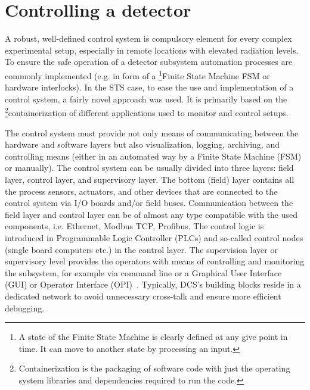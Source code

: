 \section{Controlling a detector}
A robust, well-defined control system is compulsory element for every complex experimental setup, especially in remote locations with elevated radiation levels. To ensure the safe operation of a detector subsystem automation processes are commonly implemented (e.g. in form of a \footnote{A state of the Finite State Machine is clearly defined at any give point in time. It can move to another state by processing an input.}{Finite State Machine} \gls{FSM} or hardware interlocks). In the \gls{STS} case, to ease the use and implementation of a control system, a fairly novel approach was used. It is primarily based on the \footnote{Containerization is the packaging of software code with just the operating system libraries and dependencies required to run the code.}{containerization} of different applications used to monitor and control setups. 




The control system must provide not only means of communicating between the hardware and software layers but also visualization, logging, archiving, and controlling means (either in an automated way by a Finite State Machine (\gls{FSM}) or manually). The control system can be usually divided into three layers: field layer, control layer, and supervisory layer. The bottom (field) layer contains all the process sensors, actuators, and other devices that are connected to the control system via I/O boards and/or field buses. Communication between the field layer and control layer can be of almost any type compatible with the used components, i.e. Ethernet, Modbus \gls{TCP}, Profibus. The control logic is introduced in Programmable Logic Controller (\glspl{PLC}) and so-called control nodes (single board computers etc.) in the control layer. The supervision layer or supervisory level provides the operators with means of controlling and monitoring the subsystem, for example via command line or a Graphical User Interface (\gls{GUI}) or Operator Interface (\gls{OPI})~\cite{layers}.  Typically, DCS's building blocks reside in a dedicated network to avoid unnecessary cross-talk and ensure more efficient debugging.

